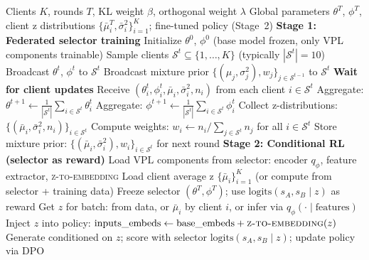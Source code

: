 \begin{algorithm}[!t]
\caption{Server-Side: Federated Aggregation, Prior Management, and Stage~2 RLHF}
\label{alg:server}
\begin{small}
\begin{algorithmic}[1]
\REQUIRE Clients $K$, rounds $T$, KL weight $\beta$, orthogonal weight $\lambda$
\ENSURE Global parameters $\theta^T$, $\phi^T$, client z distributions $\{\bar{\mu}_i^T, \bar{\sigma}_i^2\}_{i=1}^K$; fine-tuned policy (Stage~2)
\STATE \textbf{Stage 1: Federated selector training}
\STATE Initialize $\theta^0$, $\phi^0$ (base model frozen, only VPL components trainable)
    \STATE Sample clients $\mathcal{S}^t \subseteq \{1, \ldots, K\}$ (typically $|\mathcal{S}^t| = 10$)
    \STATE Broadcast $\theta^t$, $\phi^t$ to $\mathcal{S}^t$
        \STATE Broadcast mixture prior $\{(\mu_j, \sigma_j^2), w_j\}_{j \in \mathcal{S}^{t-1}}$ to $\mathcal{S}^t$
    \ENDIF
    \STATE \textbf{Wait for client updates}
    \STATE Receive $(\theta_i^t, \phi_i^t, \bar{\mu}_i, \bar{\sigma}_i^2, n_i)$ from each client $i \in \mathcal{S}^t$
    \STATE Aggregate: $\theta^{t+1} \leftarrow \frac{1}{|\mathcal{S}^t|} \sum_{i \in \mathcal{S}^t} \theta_i^t$
    \STATE Aggregate: $\phi^{t+1} \leftarrow \frac{1}{|\mathcal{S}^t|} \sum_{i \in \mathcal{S}^t} \phi_i^t$
    \STATE Collect z-distributions: $\{(\bar{\mu}_i, \bar{\sigma}_i^2, n_i)\}_{i \in \mathcal{S}^t}$
    \STATE Compute weights: $w_i \leftarrow n_i / \sum_{j \in \mathcal{S}^t} n_j$ for all $i \in \mathcal{S}^t$
    \STATE Store mixture prior: $\{(\bar{\mu}_i, \bar{\sigma}_i^2), w_i\}_{i \in \mathcal{S}^t}$ for next round
\ENDFOR
\STATE \textbf{Stage 2: Conditional RL (selector as reward)}
\STATE Load VPL components from selector: encoder $q_\phi$, feature extractor, \textsc{z-to-embedding}
\STATE Load client average z $\{\bar{\mu}_i\}_{i=1}^K$ (or compute from selector + training data)
\STATE Freeze selector $(\theta^T, \phi^T)$; use $\mathrm{logits}(s_A, s_B \mid z)$ as reward
    \STATE Get $z$ for batch: from data, or $\bar{\mu}_i$ by client $i$, or infer via $q_\phi(\cdot \mid \text{features})$
    \STATE Inject $z$ into policy: $\text{inputs\_embeds} \leftarrow \text{base\_embeds} + \textsc{z-to-embedding}(z)$
    \STATE Generate conditioned on $z$; score with selector $\mathrm{logits}(s_A, s_B \mid z)$; update policy via DPO
\ENDFOR
\end{algorithmic}
\end{small}
\end{algorithm}

